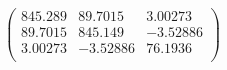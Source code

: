 \documentclass{article}
\begin{document}
\[\left(
\begin{array}{ccc}
 845.289 & 89.7015 & 3.00273 \\
 89.7015 & 845.149 & -3.52886 \\
 3.00273 & -3.52886 & 76.1936 \\
\end{array}
\right)\]
\end{document}
